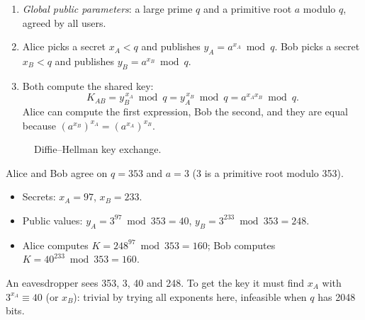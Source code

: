 \begin{definition}
\leavevmode
\begin{enumerate}
    \item \emph{Global public parameters}: a large prime $q$ and a primitive root $a$ modulo $q$, agreed by all users.
    \item Alice picks a secret $x_A < q$ and publishes $y_A = a^{x_A} \bmod q$. Bob picks a secret $x_B < q$ and publishes $y_B = a^{x_B} \bmod q$.
    \item Both compute the shared key:
    \[
        K_{AB} = y_B^{\,x_A} \bmod q = y_A^{\,x_B} \bmod q = a^{x_A x_B} \bmod q.
    \]
    Alice can compute the first expression, Bob the second, and they are equal because $(a^{x_B})^{x_A} = (a^{x_A})^{x_B}$.
\end{enumerate}
\end{definition}

\begin{figure}[H]
\centering
{}
\caption{Diffie--Hellman key exchange.}
\label{fig:dh}
\end{figure}

\begin{example}
\label{ex:dh}
Alice and Bob agree on $q = 353$ and $a = 3$ (3 is a primitive root modulo 353).
\begin{itemize}
    \item Secrets: $x_A = 97$, $x_B = 233$.
    \item Public values: $y_A = 3^{97} \bmod 353 = 40$, $y_B = 3^{233} \bmod 353 = 248$.
    \item Alice computes $K = 248^{97} \bmod 353 = 160$; Bob computes $K = 40^{233} \bmod 353 = 160$.
\end{itemize}
An eavesdropper sees 353, 3, 40 and 248. To get the key it must find $x_A$ with $3^{x_A} \equiv 40$ (or $x_B$): trivial by trying all exponents here, infeasible when $q$ has 2048 bits.
\end{example}


